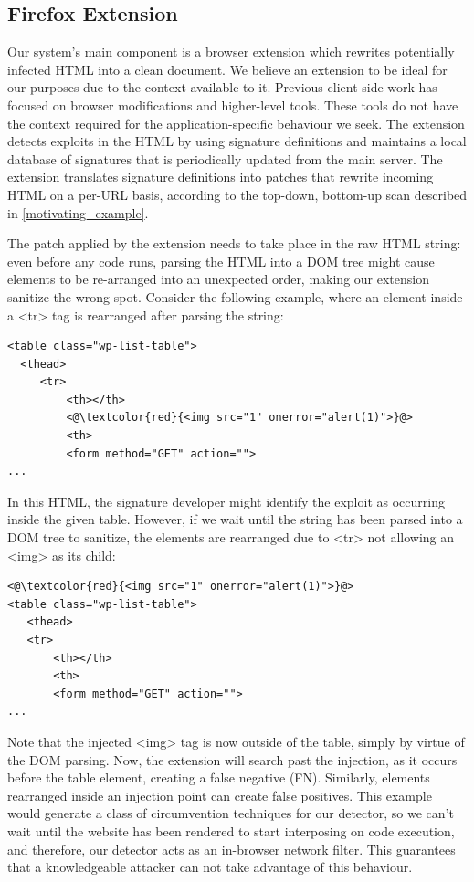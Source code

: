  \subsection{Firefox Extension} \label{firefox_extension}
 Our system's main component is a browser extension which rewrites potentially infected HTML into a clean document. We believe an extension to be ideal for our purposes due to the context available to it. Previous client-side work has focused on browser modifications and higher-level tools. These tools do not have the context required for the application-specific behaviour we seek. The extension detects exploits in the HTML by using signature definitions and maintains a local database of signatures that is periodically updated from the main server. The extension translates signature definitions into patches that rewrite incoming HTML on a per-URL basis, according to the top-down, bottom-up scan described in \autoref{motivating_example}. 

The patch applied by the extension needs to take place in the raw HTML string: even before any code runs, parsing the HTML into a DOM tree might cause elements to be re-arranged into an unexpected order, making our extension sanitize the wrong spot. 
Consider the following example, where an element inside a <tr> tag is rearranged after parsing the string:

\begin{lstlisting}
<table class="wp-list-table">
  <thead>
     <tr>
	     <th></th>
	     <@\textcolor{red}{<img src="1" onerror="alert(1)">}@>
	     <th>
   	     <form method="GET" action="">
...
\end{lstlisting}

In this HTML, the signature developer might identify the exploit as occurring inside the given table. However, if we wait until the string has been parsed into a DOM tree to sanitize, the elements are rearranged due to <tr> not allowing an <img> as its child:

\begin{lstlisting}
<@\textcolor{red}{<img src="1" onerror="alert(1)">}@>
<table class="wp-list-table">
   <thead>
   <tr>
	   <th></th>
	   <th>
       <form method="GET" action="">
...
\end{lstlisting}

Note that the injected <img> tag is now outside of the table, simply by virtue of the DOM parsing. Now, the extension will search past the injection, as it occurs before the table element, creating a false negative (FN). Similarly, elements rearranged inside an injection point can create false positives. This example would generate a class of circumvention techniques for our detector, so we can't wait until the website has been rendered to start interposing on code execution, and therefore, our detector acts as an in-browser network filter. This guarantees that a knowledgeable attacker can not take advantage of this behaviour.

